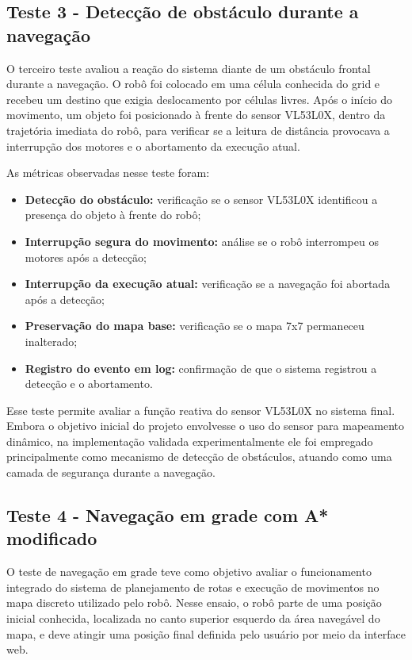 \documentclass[	12pt, Times, openright, twoside, a4paper, english, brazil]{abntex2}
\begin{document}
\subsection*{Teste 3 - Detecção de obstáculo durante a navegação}
\label{sec:teste_obstaculo}

O terceiro teste avaliou a reação do sistema diante de um obstáculo frontal durante a navegação. O robô foi colocado em uma célula conhecida do grid e recebeu um destino que exigia deslocamento por células livres. Após o início do movimento, um objeto foi posicionado à frente do sensor VL53L0X, dentro da trajetória imediata do robô, para verificar se a leitura de distância provocava a interrupção dos motores e o abortamento da execução atual.

As métricas observadas nesse teste foram:

\begin{itemize}
	\item \textbf{Detecção do obstáculo:} verificação se o sensor VL53L0X identificou a presença do objeto à frente do robô;
	\item \textbf{Interrupção segura do movimento:} análise se o robô interrompeu os motores após a detecção;
	\item \textbf{Interrupção da execução atual:} verificação se a navegação foi abortada após a detecção;
	\item \textbf{Preservação do mapa base:} verificação se o mapa 7x7 permaneceu inalterado;
	\item \textbf{Registro do evento em log:} confirmação de que o sistema registrou a detecção e o abortamento.
\end{itemize}

Esse teste permite avaliar a função reativa do sensor VL53L0X no sistema final. Embora o objetivo inicial do projeto envolvesse o uso do sensor para mapeamento dinâmico, na implementação validada experimentalmente ele foi empregado principalmente como mecanismo de detecção de obstáculos, atuando como uma camada de segurança durante a navegação.

\subsection*{Teste 4 - Navegação em grade com A* modificado}
\label{sec:teste_a_star_modificado}

O teste de navegação em grade teve como objetivo avaliar o funcionamento integrado do sistema de planejamento de rotas e execução de movimentos no mapa discreto utilizado pelo robô. Nesse ensaio, o robô parte de uma posição inicial conhecida, localizada no canto superior esquerdo da área navegável do mapa, e deve atingir uma posição final definida pelo usuário por meio da interface web.
\end{document}
